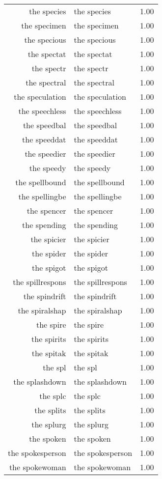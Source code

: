 \begin{table}[ht]
\begin{tabular}{rlr}
  the species & the species & 1.00 \\ 
  the specimen & the specimen & 1.00 \\ 
  the specious & the specious & 1.00 \\ 
  the spectat & the spectat & 1.00 \\ 
  the spectr & the spectr & 1.00 \\ 
  the spectral & the spectral & 1.00 \\ 
  the speculation & the speculation & 1.00 \\ 
  the speechless & the speechless & 1.00 \\ 
  the speedbal & the speedbal & 1.00 \\ 
  the speeddat & the speeddat & 1.00 \\ 
  the speedier & the speedier & 1.00 \\ 
  the speedy & the speedy & 1.00 \\ 
  the spellbound & the spellbound & 1.00 \\ 
  the spellingbe & the spellingbe & 1.00 \\ 
  the spencer & the spencer & 1.00 \\ 
  the spending & the spending & 1.00 \\ 
  the spicier & the spicier & 1.00 \\ 
  the spider & the spider & 1.00 \\ 
  the spigot & the spigot & 1.00 \\ 
  the spillrespons & the spillrespons & 1.00 \\ 
  the spindrift & the spindrift & 1.00 \\ 
  the spiralshap & the spiralshap & 1.00 \\ 
  the spire & the spire & 1.00 \\ 
  the spirits & the spirits & 1.00 \\ 
  the spitak & the spitak & 1.00 \\ 
  the spl & the spl & 1.00 \\ 
  the splashdown & the splashdown & 1.00 \\ 
  the splc & the splc & 1.00 \\ 
  the splits & the splits & 1.00 \\ 
  the splurg & the splurg & 1.00 \\ 
  the spoken & the spoken & 1.00 \\ 
  the spokesperson & the spokesperson & 1.00 \\ 
  the spokewoman & the spokewoman & 1.00 \\ 

\end{tabular}
\end{table}
